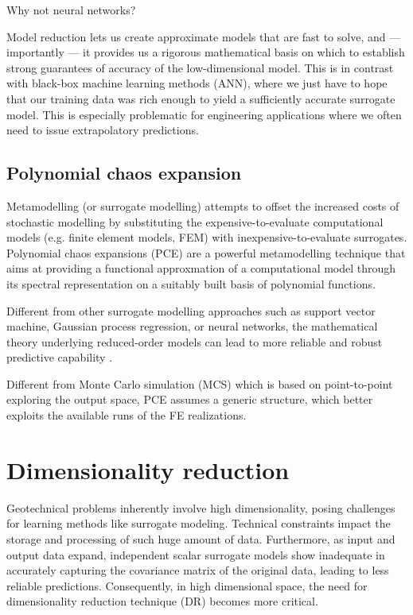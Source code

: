 Why not neural networks?

Model reduction lets us create approximate models that are fast to solve, and — importantly — it provides us a rigorous mathematical basis on which to establish strong guarantees of accuracy of the low-dimensional model. This is in contrast with black-box machine learning methods (ANN), where we just have to hope that our training data was rich enough to yield a sufficiently accurate surrogate model. This is especially problematic for engineering applications where we often need to issue extrapolatory predictions.

\subsection{Polynomial chaos expansion}
Metamodelling (or surrogate modelling) attempts to offset the increased costs of stochastic modelling by substituting the expensive-to-evaluate computational models (e.g. finite element models, FEM) with inexpensive-to-evaluate surrogates.
Polynomial chaos expansions (PCE) are a powerful metamodelling technique that aims at providing a functional approxmation of a computational model through its spectral representation on a suitably built basis of polynomial functions.

Different from other surrogate modelling approaches such as support vector machine, Gaussian process regression, or neural networks, the mathematical theory underlying reduced-order models can lead to more reliable and robust predictive capability \citep{frangos2010,kapteyn2021}.

Different from Monte Carlo simulation (MCS) which is based on point-to-point exploring the output space, PCE assumes a generic structure, which better exploits the available runs of the FE realizations.



\section{Dimensionality reduction}


Geotechnical problems inherently involve high dimensionality, posing challenges for learning methods like surrogate modeling. Technical constraints impact the storage and processing of such huge amount of data. Furthermore, as input and output data expand, independent scalar surrogate models show inadequate in accurately capturing the covariance matrix of the original data, leading to less reliable predictions. Consequently, in high dimensional space, the need for dimensionality reduction technique (DR) becomes more critical. 


